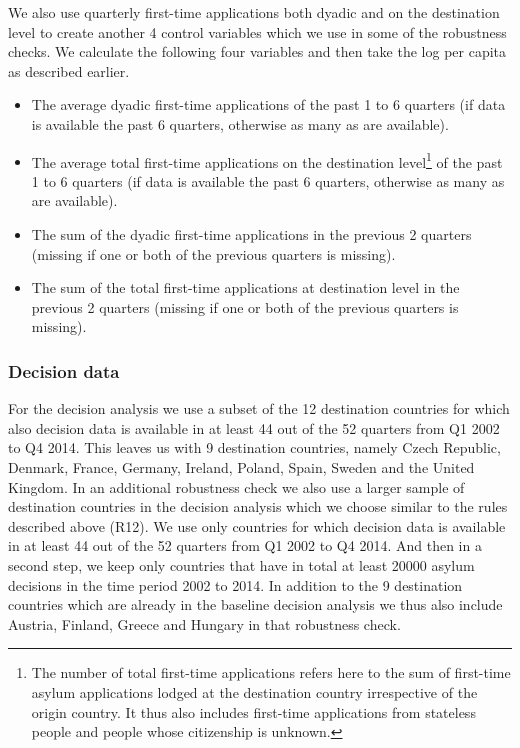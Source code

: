 \documentclass[11pt,a4paper]{scrartcl}
\begin{document}
We also use quarterly first-time applications both dyadic and on the destination level to create another 4 control variables which we use in some of the robustness checks. We calculate the following four variables and then take the log per capita as described earlier. 
\begin{itemize}
	\itemsep-0.2em
	\item The average dyadic first-time applications of the past 1 to 6 quarters (if data is available the past 6 quarters, otherwise as many as are available).
	\item  The average total first-time applications on the destination level\footnote{The number of total first-time applications refers here to the sum of first-time asylum applications lodged at the destination country irrespective of the origin country. It thus also includes first-time applications from stateless people and people whose citizenship is unknown.} of the past 1 to 6 quarters (if data is available the past 6 quarters, otherwise as many as are available).
	\item The sum of the dyadic first-time applications in the previous 2 quarters (missing if one or both of the previous quarters is missing).
	\item The sum of the total first-time applications at destination level in the previous 2 quarters (missing if one or both of the previous quarters is missing).
\end{itemize}

\subsubsection{Decision data}
For the decision analysis we use a subset of the 12 destination countries for which also decision data is available in at least 44 out of the 52 quarters from Q1 2002 to Q4 2014. This leaves us with 9 destination countries, namely Czech Republic, Denmark, France, Germany, Ireland, Poland, Spain, Sweden and the United Kingdom. In an additional robustness check we also use a larger sample of destination countries in the decision analysis which we choose similar to the rules described above (R12). We use only countries for which decision data is available in at least 44 out of the 52 quarters from Q1 2002 to Q4 2014. And then in a second step, we keep only countries that have in total at least 20000 asylum decisions in the time period 2002 to 2014. In addition to the 9 destination countries which are already in the baseline decision analysis we thus also include Austria, Finland, Greece and Hungary in that robustness check.
\end{document}
